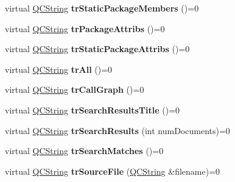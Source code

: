 \begin{DoxyCompactItemize}
\item 
\hypertarget{class_translator_ab2bad8fa44a8b29f82c15007f94ef1fc}{virtual \hyperlink{class_q_c_string}{Q\-C\-String} {\bfseries tr\-Static\-Package\-Members} ()=0}\label{class_translator_ab2bad8fa44a8b29f82c15007f94ef1fc}

\item 
\hypertarget{class_translator_aa0b3a2d3408656a0af5285a4e1eb041c}{virtual \hyperlink{class_q_c_string}{Q\-C\-String} {\bfseries tr\-Package\-Attribs} ()=0}\label{class_translator_aa0b3a2d3408656a0af5285a4e1eb041c}

\item 
\hypertarget{class_translator_a14709b090fafdcb9921338a6eef5b645}{virtual \hyperlink{class_q_c_string}{Q\-C\-String} {\bfseries tr\-Static\-Package\-Attribs} ()=0}\label{class_translator_a14709b090fafdcb9921338a6eef5b645}

\item 
\hypertarget{class_translator_af5e5e8ea7cb2ef0f74d7bfbb82a79226}{virtual \hyperlink{class_q_c_string}{Q\-C\-String} {\bfseries tr\-All} ()=0}\label{class_translator_af5e5e8ea7cb2ef0f74d7bfbb82a79226}

\item 
\hypertarget{class_translator_aa1f8bcd70ad1162bf7afff4885d0e29c}{virtual \hyperlink{class_q_c_string}{Q\-C\-String} {\bfseries tr\-Call\-Graph} ()=0}\label{class_translator_aa1f8bcd70ad1162bf7afff4885d0e29c}

\item 
\hypertarget{class_translator_a7df15ba3e5882672efe94c840e493d33}{virtual \hyperlink{class_q_c_string}{Q\-C\-String} {\bfseries tr\-Search\-Results\-Title} ()=0}\label{class_translator_a7df15ba3e5882672efe94c840e493d33}

\item 
\hypertarget{class_translator_acac1cacba9e355e6ee7a9bda2e4dade7}{virtual \hyperlink{class_q_c_string}{Q\-C\-String} {\bfseries tr\-Search\-Results} (int num\-Documents)=0}\label{class_translator_acac1cacba9e355e6ee7a9bda2e4dade7}

\item 
\hypertarget{class_translator_ac8804a7b9912459726a3466a9f0090d6}{virtual \hyperlink{class_q_c_string}{Q\-C\-String} {\bfseries tr\-Search\-Matches} ()=0}\label{class_translator_ac8804a7b9912459726a3466a9f0090d6}

\item 
\hypertarget{class_translator_a8f2fe304e777e2f34db4845c687947cf}{virtual \hyperlink{class_q_c_string}{Q\-C\-String} {\bfseries tr\-Source\-File} (\hyperlink{class_q_c_string}{Q\-C\-String} \&filename)=0}\label{class_translator_a8f2fe304e777e2f34db4845c687947cf}


\end{DoxyCompactItemize}
